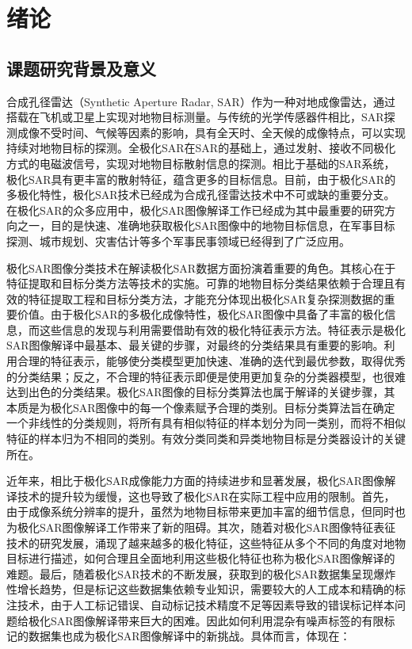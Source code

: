 \chapter{绪\hspace{6pt}论}

\section{课题研究背景及意义}
合成孔径雷达（Synthetic Aperture Radar, SAR）作为一种对地成像雷达，通过搭载在飞机或卫星上实现对地物目标测量。与传统的光学传感器件相比，SAR探测成像不受时间、气候等因素的影响，具有全天时、全天候的成像特点，可以实现持续对地物目标的探测。全极化SAR在SAR的基础上，通过发射、接收不同极化方式的电磁波信号，实现对地物目标散射信息的探测。相比于基础的SAR系统，极化SAR具有更丰富的散射特征，蕴含更多的目标信息。目前，由于极化SAR的多极化特性，极化SAR技术已经成为合成孔径雷达技术中不可或缺的重要分支。在极化SAR的众多应用中，极化SAR图像解译工作已经成为其中最重要的研究方向之一，目的是快速、准确地获取极化SAR图像中的地物目标信息，在军事目标探测、城市规划、灾害估计等多个军事民事领域已经得到了广泛应用。

极化SAR图像分类技术在解读极化SAR数据方面扮演着重要的角色。其核心在于特征提取和目标分类方法等技术的实施。可靠的地物目标分类结果依赖于合理且有效的特征提取工程和目标分类方法，才能充分体现出极化SAR复杂探测数据的重要价值。由于极化SAR的多极化成像特性，极化SAR图像中具备了丰富的极化信息，而这些信息的发现与利用需要借助有效的极化特征表示方法。特征表示是极化SAR图像解译中最基本、最关键的步骤，对最终的分类结果具有重要的影响。利用合理的特征表示，能够使分类模型更加快速、准确的迭代到最优参数，取得优秀的分类结果；反之，不合理的特征表示即便是使用更加复杂的分类器模型，也很难达到出色的分类结果。极化SAR图像的目标分类算法也属于解译的关键步骤，其本质是为极化SAR图像中的每一个像素赋予合理的类别。目标分类算法旨在确定一个非线性的分类规则，将所有具有相似特征的样本划分为同一类别，而将不相似特征的样本归为不相同的类别。有效分类同类和异类地物目标是分类器设计的关键所在。

近年来，相比于极化SAR成像能力方面的持续进步和显著发展，极化SAR图像解译技术的提升较为缓慢，这也导致了极化SAR在实际工程中应用的限制。首先，由于成像系统分辨率的提升，虽然为地物目标带来更加丰富的细节信息，但同时也为极化SAR图像解译工作带来了新的阻碍。其次，随着对极化SAR图像特征表征技术的研究发展，涌现了越来越多的极化特征，这些特征从多个不同的角度对地物目标进行描述，如何合理且全面地利用这些极化特征也称为极化SAR图像解译的难题。最后，随着极化SAR技术的不断发展，获取到的极化SAR数据集呈现爆炸性增长趋势，但是标记这些数据集依赖专业知识，需要较大的人工成本和精确的标注技术，由于人工标记错误、自动标记技术精度不足等因素导致的错误标记样本问题给极化SAR图像解译带来巨大的困难。因此如何利用混杂有噪声标签的有限标记的数据集也成为极化SAR图像解译中的新挑战。具体而言，体现在：

